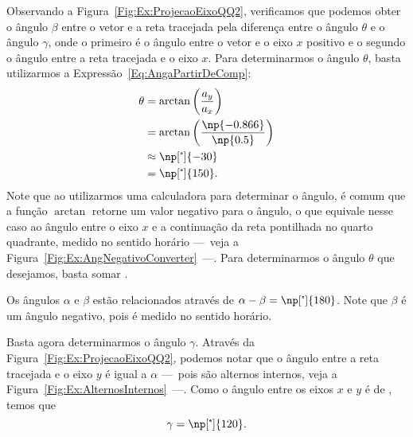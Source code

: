 Observando a Figura~\ref{Fig:Ex:ProjecaoEixoQQ2}, verificamos que podemos obter o ângulo $\beta$ entre o vetor e a reta tracejada pela diferença entre o ângulo $\theta$ e o ângulo $\gamma$, onde o primeiro é o ângulo entre o vetor e o eixo $x$ positivo e o segundo o ângulo entre a reta tracejada e o eixo $x$. Para determinarmos o ângulo $\theta$, basta utilizarmos a Expressão~\eqref{Eq:AngaPartirDeComp}:
\begin{align}
    \theta &= \arctan \left(\frac{a_y}{a_x}\right) \\
    &= \arctan \left(\frac{\np{-0.866}}{\np{0.5}}\right) \\
    &\approx \np[\tcdegree]{-30} \\
    &= \np[\tcdegree]{150}.
\end{align}
%
Note que ao utilizarmos uma calculadora para determinar o ângulo, é comum que a função $\arctan$ retorne um valor negativo para o ângulo, o que equivale nesse caso ao ângulo entre o eixo $x$ e a continuação da reta pontilhada no quarto quadrante, medido no sentido horário ---~veja a Figura~\ref{Fig:Ex:AngNegativoConverter}~---. Para determinarmos o ângulo $\theta$ que desejamos, basta somar .

\begin{marginfigure}[-6cm]
\centering
{}
\caption{Os ângulos $\alpha$ e $\beta$ estão relacionados através de $\alpha - \beta = \np[\tcdegree]{180}$. Note que $\beta$ é um ângulo negativo, pois é medido no sentido horário.\label{Fig:Ex:AngNegativoConverter}}
\end{marginfigure}

Basta agora determinarmos o ângulo $\gamma$. Através da Figura~\ref{Fig:Ex:ProjecaoEixoQQ2}, podemos notar que o ângulo entre a reta tracejada e o eixo $y$ é igual a $\alpha$ ---~pois são alternos internos, veja a Figura~\ref{Fig:Ex:AlternosInternos}~---. Como o ângulo entre os eixos $x$ e $y$ é de , temos que
\begin{equation}
    \gamma = \np[\tcdegree]{120}.
\end{equation}

